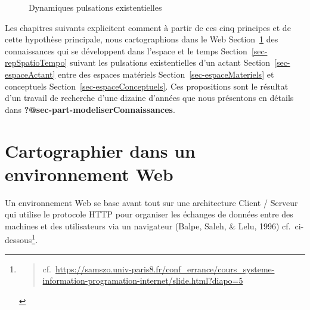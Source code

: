 \documentclass[
  a4paper,
  DIV=11,
  numbers=noendperiod]{scrreprt}
\begin{document}
\begin{figure}


\caption{\label{fig-dynamiquesPulsationsExistentielles}Dynamiques
pulsations existentielles}

\end{figure}%

Les chapitres suivants explicitent comment à partir de ces cinq
principes et de cette hypothèse principale, nous cartographions dans le
Web Section~\ref{sec-cartoEnvWeb} des connaissances qui se développent
dans l'espace et le temps Section~\ref{sec-repSpatioTempo} suivant les
pulsations existentielles d'un actant Section~\ref{sec-espaceActant}
entre des espaces matériels Section~\ref{sec-espaceMateriels} et
conceptuels Section~\ref{sec-espaceConceptuels}. Ces propositions sont
le résultat d'un travail de recherche d'une dizaine d'années que nous
présentons en détails dans \textbf{?@sec-part-modeliserConnaissances}.

\section{Cartographier dans un environnement Web}\label{sec-cartoEnvWeb}

Un environnement Web se base avant tout sur une architecture Client /
Serveur qui utilise le protocole HTTP pour organiser les échanges de
données entre des machines et des utilisateurs via un navigateur (Balpe,
Saleh, \& Lelu, 1996) cf.~ci-dessous\footnote{\begin{quote}
  cf.~\url{https://samszo.univ-paris8.fr/conf_errance/cours_systeme-information-programation-internet/slide.html?diapo=5}
  \end{quote}}.
\end{document}
